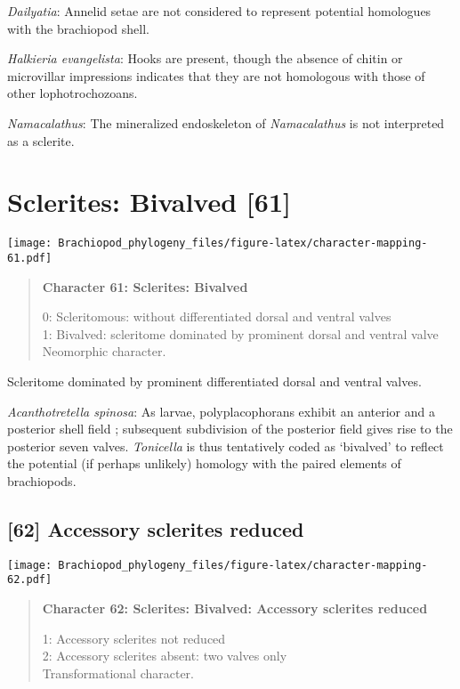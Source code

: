 \documentclass[openany]{book}
\theoremstyle{definition}
\theoremstyle{definition}
\theoremstyle{definition}
\theoremstyle{remark}
\begin{document}
\hypertarget{Dailyatia-coding-60}{}
\emph{Dailyatia}: Annelid setae are not considered to represent
potential homologues with the brachiopod shell.

\hypertarget{Halkieria_evangelista-coding-60}{}
\emph{Halkieria evangelista}: Hooks are present, though the absence of
chitin or microvillar impressions indicates that they are not homologous
with those of other lophotrochozoans.

\hypertarget{Namacalathus-coding-60}{}
\emph{Namacalathus}: The mineralized endoskeleton of \emph{Namacalathus}
is not interpreted as a sclerite.

\section{Sclerites: Bivalved {[}61{]}}\label{sclerites-bivalved-61}

\texttt{[image: Brachiopod\_phylogeny\_files/figure-latex/character-mapping-61.pdf]}

\begin{quote}
\textbf{Character 61: Sclerites: Bivalved}

0: Scleritomous: without differentiated dorsal and ventral valves\\
1: Bivalved: scleritome dominated by prominent dorsal and ventral
valve\\
Neomorphic character.
\end{quote}

Scleritome dominated by prominent differentiated dorsal and ventral
valves.

\hypertarget{Acanthotretella_spinosa-coding-61}{}
\emph{Acanthotretella spinosa}: As larvae, polyplacophorans exhibit an
anterior and a posterior shell field \citep{Wanninger2002C}; subsequent
subdivision of the posterior field gives rise to the posterior seven
valves. \emph{Tonicella} is thus tentatively coded as `bivalved' to
reflect the potential (if perhaps unlikely) homology with the paired
elements of brachiopods.

\subsection*{{[}62{]} Accessory sclerites
reduced}\label{accessory-sclerites-reduced}

\texttt{[image: Brachiopod\_phylogeny\_files/figure-latex/character-mapping-62.pdf]}

\begin{quote}
\textbf{Character 62: Sclerites: Bivalved: Accessory sclerites reduced}

1: Accessory sclerites not reduced\\
2: Accessory sclerites absent: two valves only\\
Transformational character.
\end{quote}
\end{document}
